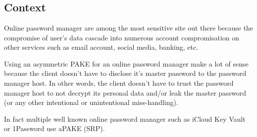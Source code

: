 \documentclass[../report.tex]{subfiles}
\begin{document}
\chapter{}
\section{Context}
Online password manager are among the most sensitive site out there because the compromise of user's data cascade into numerous account compromisation on other services such as email account, social media, banking, etc.

Using an asymmetric PAKE for an online password manager make a lot of sense because the client doesn't have to disclose it's master password to the password manager host. In other words, the client doesn't have to trust the password manager host to not decrypt its personal data and/or leak the master password (or any other intentional or unintentional miss-handling).

In fact multiple well known online password manager such as iCloud Key Vault or 1Password use aPAKE (SRP).
\end{document}
